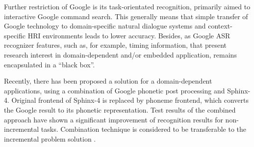 Further restriction of Google is its task-orientated recognition, primarily 
aimed to interactive Google command search. This generally means that simple
transfer of Google technology to domain-specific natural dialogue systems and
context-specific HRI environments leads to lower accuracy. Besides, as Google
ASR recognizer features, such as, for example, timing information, that present
research interest in domain-dependent and/or embedded application, remains encapsulated in a ``black box''. 

Recently, there has been proposed a solution for a domain-dependent
applications, using a combination of Google phonetic post processing and
Sphinx-4. Original frontend of Sphinx-4 is replaced by phoneme frontend, which
converts the Google result to its phonetic representation. Test
results of the combined approach have shown a significant improvement of
recognition results for non-incremental tasks. Combination technique is
considered to be transferable to the incremental problem solution \parencite {twiefeletal2014}.





